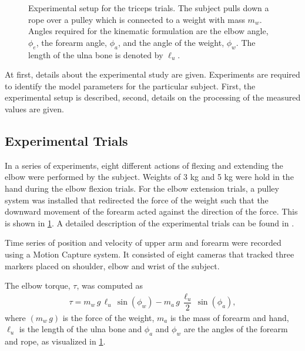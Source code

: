 \begin{figure}%
    \centering%
    \def\svgwidth{5cm}%
    \caption{Experimental setup for the triceps trials. The subject pulls down a rope over a pulley which is connected to a weight with mass $m_w$.
    Angles required for the kinematic formulation are the elbow angle, $\phi_e$, the forearm angle, $\phi_a$, and the angle of the weight, $\phi_w$. The length of the ulna bone is denoted by $\ell_u$.}%
    \label{fig:summer_school_study}%
\end{figure}%

At first, details about the experimental study are given. Experiments are required to identify the model parameters for the particular subject. First, the experimental setup is described, second, details on the processing of the measured values are given.

\subsection{Experimental Trials}

In a series of experiments, eight different actions of flexing and extending the elbow were performed by the subject. Weights of 3 kg and 5 kg were hold in the hand during the elbow flexion trials. For the elbow extension trials, a pulley system was installed that redirected the force of the weight such that the downward movement of the forearm acted against the direction of the force. This is shown in \cref{fig:summer_school_study}. A detailed description of the experimental trials can be found in \cite{summerschool2019}.

Time series of position and velocity of upper arm and forearm were recorded using a Motion Capture system. It consisted of eight cameras that tracked three markers placed on shoulder, elbow and wrist of the subject. 

The elbow torque, $\tau$, was computed as
\begin{equation*}
  \begin{array}{lll}
    \tau = m_w\,g\,\ell_u\,\sin(\phi_w) - m_{a}\,g\,\dfrac{\ell_u}{2}\,\sin(\phi_a),
  \end{array}
\end{equation*}
where $(m_w\,g)$ is the force of the weight, $m_{a}$ is the mass of forearm and hand, $\ell_u$ is the length of the ulna bone and $\phi_a$ and $\phi_w$ are the angles of the forearm and rope, as visualized in \cref{fig:summer_school_study}.

